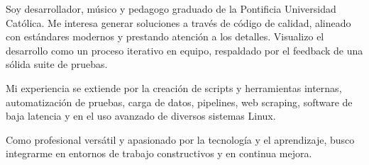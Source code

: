 

\begin{cvparagraph}

    Soy desarrollador, músico y pedagogo graduado de la Pontificia Universidad
    Católica. Me interesa generar soluciones a través de código de calidad,
    alineado con estándares modernos y prestando atención a los detalles.
    Visualizo el desarrollo como un proceso iterativo en equipo, respaldado por
    el feedback de una sólida suite de pruebas.

    Mi experiencia se extiende por la creación de scripts y herramientas
    internas, automatización de pruebas, carga de datos, pipelines, web
    scraping, software de baja latencia y en el uso avanzado de diversos
    sistemas Linux.

    Como profesional versátil y apasionado por la tecnología y el aprendizaje,
    busco integrarme en entornos de trabajo constructivos y en continua mejora.

\end{cvparagraph}

